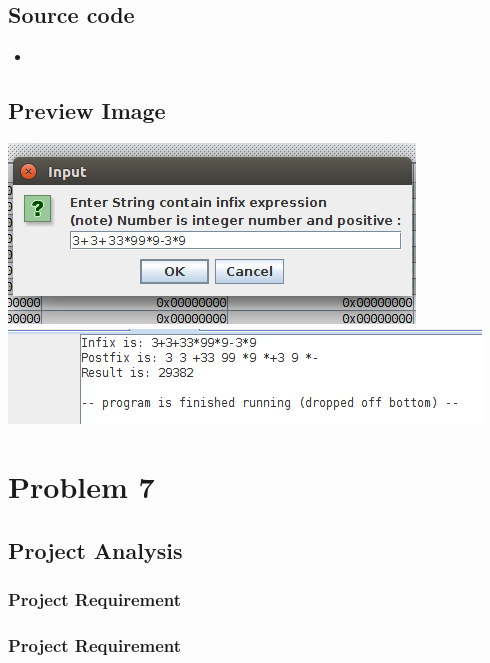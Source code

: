 \documentclass[a4paper]{article}
\newcommand{\mipsscript}[2]{
	\begin{itemize}
		\item[]
	\end{itemize}
}
\begin{document}
\subsection{Source code}
\mipsscript{infix-Postfix_caculate}{Infix - Postfix expression}
\subsection{Preview Image}
	\begin{center}
		\includegraphics[width=0.85\columnwidth]{1} %
		\includegraphics[width=0.85\columnwidth]{2} %
	\end{center}


\section{Problem 7}
\subsection{Project Analysis}

\subsubsection{Project Requirement}

\subsubsection{Project Requirement}
\end{document}
